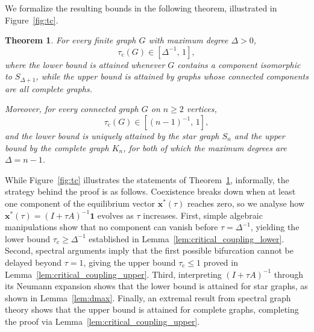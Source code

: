 \documentclass[a4paper,12pt]{article}
\newtheorem{theorem}{Theorem}
\begin{document}
We formalize the resulting bounds in the following theorem, illustrated in Figure~\ref{fig:tc}.
\begin{theorem}\label{th:general}
    For every finite graph $G$ with maximum degree $\Delta>0$,
    \begin{equation}
        \tau_{\mathrm{c}}(G) \in \left[\Delta^{-1},\, 1\right],
        \label{eq:tc_bound}
    \end{equation}
    where the lower bound is attained whenever $G$ contains a component isomorphic to $S_{\Delta+1}$, while the upper bound is attained by graphs whose connected components are all complete graphs.

    Moreover, for every connected graph $G$ on $n\ge 2$ vertices, 
    \begin{equation}
        \tau_{\mathrm{c}}(G) \in \left[(n-1)^{-1},\, 1\right],
    \end{equation}
    and the lower bound is uniquely attained by the star graph $S_n$ and the upper bound by the complete graph $K_n$, for both of which the maximum degrees are $\Delta=n-1$.
\end{theorem}
 While Figure~\ref{fig:tc} illustrates the statements of Theorem~\ref{th:general}, informally, the strategy behind the proof is as follows. Coexistence breaks down when at least one component of the equilibrium vector $\mathbf{x}^*(\tau)$ reaches zero, so we analyse how $\mathbf{x}^*(\tau) = (I + \tau A)^{-1}\mathbf{1}$ evolves as $\tau$ increases. First, simple algebraic manipulations show that no component can vanish before $\tau = \Delta^{-1}$, yielding the lower bound $\tau_{\mathrm c} \ge \Delta^{-1}$ established in Lemma~\ref{lem:critical_coupling_lower}.  
Second, spectral arguments imply that the first possible bifurcation cannot be delayed beyond $\tau = 1$, giving the upper bound $\tau_{\mathrm c} \le 1$ proved in Lemma~\ref{lem:critical_coupling_upper}.  
Third, interpreting $(I+\tau A)^{-1}$ through its Neumann expansion shows that the lower bound is attained for star graphs, as shown in Lemma~\ref{lem:dmax}.  
Finally, an extremal result from spectral graph theory shows that the upper bound is attained for complete graphs, completing the proof via Lemma~\ref{lem:critical_coupling_upper}.
\end{document}
